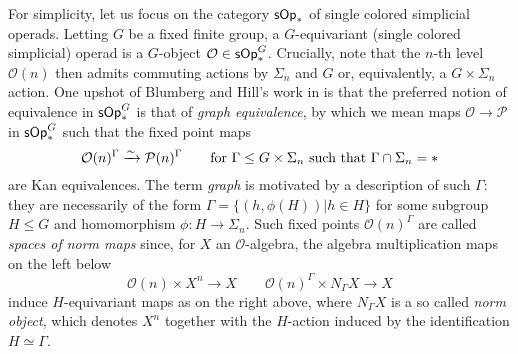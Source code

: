 \documentclass[a4paper,10pt]{article}%
\numberwithin{equation}{section}
\numberwithin{figure}{section}
\theoremstyle{definition} %
\newtheorem{remark}[equation]{Remark}%
\newcommand{\set}[1]{\left\{#1\right\}}%
\newcommand{\longto}{\longrightarrow}%
\newcommand{\vect}[1]{\text{\overrightharp{\ensuremath{#1}}}}
\DeclareMathOperator{\Hom}{Hom}%
\renewcommand{\O}{\ensuremath{\mathcal O}}
\newcommand{\1}{\ensuremath{\mathbbm 1}}%
\begin{document}
For simplicity,
let us focus on the category
$\mathsf{sOp}_{\**}$
of single colored simplicial operads.
Letting $G$ be a fixed finite group,
a $G$-equivariant (single colored simplicial) operad
is a $G$-object
$\O \in \mathsf{sOp}_{\**}^G$.
Crucially, 
note that the $n$-th level
$\O(n)$ then admits commuting actions
by $\Sigma_n$ and $G$ or, equivalently,
a $G \times \Sigma_n$ action.
One upshot of Blumberg and Hill's work in 
\cite{BH15}
is that the preferred notion of equivalence
in $\mathsf{sOp}_{\**}^G$
is that of \emph{graph equivalence},
by which we mean maps
$\mathcal{O} \to \mathcal{P}$
in $\mathsf{sOp}_{\**}^G$
such that the fixed point maps
\begin{equation}\label{NORMMAP EQ}
	\mathcal{O}(n)^{\Gamma}
	\xrightarrow{\sim}
	\mathcal{P}(n)^{\Gamma}
\qquad
	\text{for }
	\Gamma \leq G \times \Sigma_n
	\text{ such that }
	\Gamma \cap \Sigma_n = \**
\end{equation}
are Kan equivalences.
%
The term \emph{graph} is motivated by a description of such $\Gamma$:
they are necessarily of the form
$\Gamma = \{(h,\phi(H)) | h \in H\}$
for some subgroup $H \leq G$
and homomorphism $\phi \colon H \to \Sigma_n$.
Such fixed points $\mathcal{O}(n)^{\Gamma}$
are called 
\emph{spaces of norm maps}
since, for $X$ an $\O$-algebra,
 the algebra multiplication maps
 on the left below
 \[
 	\O(n) \times X^n \to X
 \qquad
 	\O(n)^{\Gamma} \times N_{\Gamma} X \to X
 \]
 induce $H$-equivariant maps as on the right above,
where 
$N_{\Gamma} X$ is a so called 
\emph{norm object},
which denotes $X^n$ together with the $H$-action induced by the identification $H \simeq \Gamma$.
\end{document}
